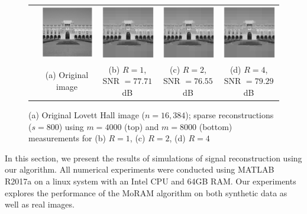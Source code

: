 \begin{figure}[t!]
\begin{center}
\begin{tabular}{ccccc}
			\rotatebox{90}{$~~~~~~~m=8000$} &
			\includegraphics[width=0.22\linewidth]{./fig/lovett_original.pdf} &
			\includegraphics[width=0.22\linewidth]{./fig/lovett_r1_m_8000_s_800.pdf} &
			\includegraphics[width=0.22\linewidth]{./fig/lovett_r2_m_8000_s_800.pdf} &
			\includegraphics[width=0.22\linewidth]{./fig/lovett_r4_m_8000_s_800.pdf}  \\
			& \small{(a) Original image}& \small{(b) $R=1$, SNR $=77.71$dB} &\small{ (c) $R=2$, SNR $=76.55$dB} & \small{(d) $R=4$, SNR $=79.29$dB} \\
		\end{tabular}
	\end{center}
	\caption{{(a) Original Lovett Hall image ($n=16,384$); sparse reconstructions ($s=800$) using $m=4000$ (top) and $m=8000$ (bottom) measurements for (b) $R=1$, (c) $R=2$, (d) $R=4$}}
	\label{fig:lovett}
\end{figure}

In this section, we present the results of simulations of signal reconstruction using our algorithm. All numerical experiments were conducted using MATLAB R2017a on a linux system with an Intel CPU and 64GB RAM. Our experiments explores the performance of the MoRAM algorithm on both synthetic data as well as real images.

